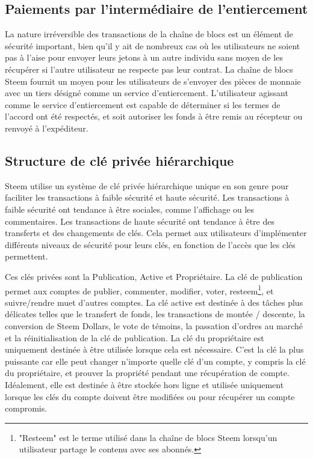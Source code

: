 \documentclass[11pt]{article}
\begin{document}
\subsection{Paiements par l'intermédiaire de l'entiercement}
\label{sec:org15abc7b}
La nature irréversible des transactions de la chaîne de blocs est un élément
de sécurité important, bien qu'il y ait de nombreux cas où les
utilisateurs ne soient pas à l'aise pour envoyer leurs jetons à un
autre individu sans moyen de les récupérer si l'autre utilisateur
ne respecte pas leur contrat. La chaîne de blocs Steem fournit un
moyen pour les utilisateurs de s'envoyer des pièces de monnaie avec
un tiers désigné comme un service d'entiercement. L'utilisateur
agissant comme le service d'entiercement est capable de déterminer
si les termes de l'accord ont été respectés, et soit autoriser les
fonds à être remis au récepteur ou renvoyé à l'expéditeur.
\subsection{Structure de clé privée hiérarchique}
\label{sec:org85c60fc}
Steem utilise un système de clé privée hiérarchique unique en son
genre pour faciliter les transactions à faible sécurité et haute
sécurité. Les transactions à faible sécurité ont tendance à être
sociales, comme l'affichage ou les commentaires. Les transactions
de haute sécurité ont tendance à être des transferts et des
changements de clés. Cela permet aux utilisateurs d'implémenter
différents niveaux de sécurité pour leurs clés, en fonction de
l'accès que les clés permettent. 

Ces clés privées sont la Publication, Active et Propriétaire. La
clé de publication permet aux comptes de publier, commenter,
modifier, voter, resteem\footnote{"Resteem" est le terme utilisé dans la chaîne de blocs Steem
lorsqu'un utilisateur partage le contenu avec ses abonnés.}, et suivre/rendre muet d'autres
comptes. La clé active est destinée à des tâches plus délicates
telles que le transfert de fonds, les transactions de montée /
descente, la conversion de Steem Dollars, le vote de témoins, la
passation d'ordres au marché et la réinitialisation de la clé de
publication. La clé du propriétaire est uniquement destinée à
être utilisée lorsque cela est nécessaire. C'est la clé la plus
puissante car elle peut changer n'importe quelle clé d'un compte, y
compris la clé du propriétaire, et prouver la propriété pendant une
récupération de compte. Idéalement, elle est destinée à être stockée
hors ligne et utilisée uniquement lorsque les clés du compte doivent
être modifiées ou pour récupérer un compte compromis.
\end{document}
